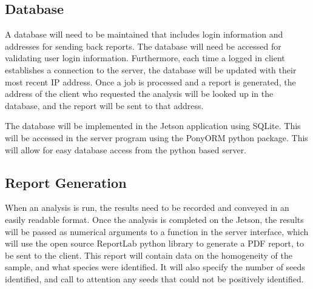 \documentclass[onecolumn, draftclsnofoot,10pt, compsoc]{IEEEtran}
\begin{document}
    \subsection{Database}
    A database will need to be maintained that includes login information and addresses for sending back reports.
    The database will need be accessed for validating user login information.
    Furthermore, each time a logged in client establishes a connection to the server, the database will be updated with their most recent IP address.
    Once a job is processed and a report is generated, the address of the client who requested the analysis will be looked up in the database, and the report will be sent to that address.

    The database will be implemented in the Jetson application using SQLite.
    This will be accessed in the server program using the PonyORM python package.
    This will allow for easy database access from the python based server.


    \subsection{Report Generation}
    When an analysis is run, the results need to be recorded and conveyed in an easily readable format.
    Once the analysis is completed on the Jetson, the results will be passed as numerical arguments to a function in the server interface, which will use the open source ReportLab python library to generate a PDF report, to be sent to the client.
    This report will contain data on the homogeneity of the sample, and what species were identified.
    It will also specify the number of seeds identified, and call to attention any seeds that could not be positively identified.

    
\end{document}

